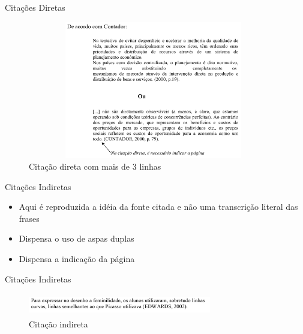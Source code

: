 \begin{frame}	
	\begin{block}{Citações Diretas}	
		 \begin{figure}[!htb]
			\centering	  				
			\includegraphics[height=6cm, width = 11cm]{./pic/diretamais3linhas.png}
			\caption{Citação direta com mais de 3 linhas \cite{GUIA_SENAC}}
			\label{fig_citacaodiretamais3linhas}
		\end{figure}
	\end{block}
\end{frame}

\begin{frame}	
	\begin{block}{Citações Indiretas}	
		\begin{itemize}
			\item Aqui é reproduzida a idéia da fonte citada e não uma transcrição literal das frases
			\item Dispensa o uso de aspas duplas
			\item Dispensa a indicação da página
		\end{itemize}
	\end{block}
\end{frame}

\begin{frame}	
	\begin{block}{Citações Indiretas}	
		 \begin{figure}[!htb]
			\centering	  				
			\includegraphics[height=1cm, width = 8cm]{./pic/citacaoindireta.png}
			\caption{Citação indireta \cite{GUIA_SENAC}}
			\label{fig_citacaoindireta}
		\end{figure}
	\end{block}
\end{frame}

